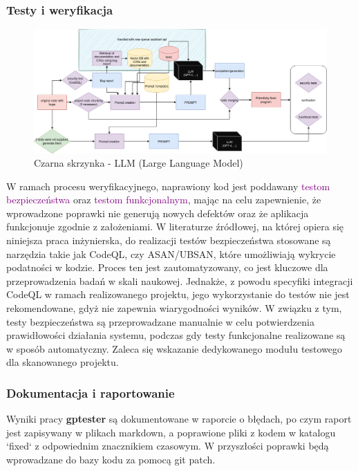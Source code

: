 \subsubsection{Testy i weryfikacja}
\begin{figure}[h]
    \centering
    \includegraphics[clip, trim=25cm 2cm 0cm 4cm, width=0.9\linewidth]{img/gptester.drawio.png}
    \caption{Czarna skrzynka - LLM (Large Language Model)}
    \label{fig:przyciety_obraz2}
\end{figure}
W ramach procesu weryfikacyjnego, naprawiony kod jest poddawany \textcolor{purple}{testom bezpieczeństwa} oraz \textcolor{purple}{testom funkcjonalnym}, mając na celu zapewnienie, że wprowadzone poprawki nie generują nowych defektów oraz że aplikacja funkcjonuje zgodnie z założeniami. W literaturze źródłowej, na której opiera się niniejsza praca inżynierska, do realizacji testów bezpieczeństwa stosowane są narzędzia takie jak CodeQL, czy ASAN/UBSAN, które umożliwiają wykrycie podatności w kodzie. Proces ten jest zautomatyzowany, co jest kluczowe dla przeprowadzenia badań w skali naukowej. Jednakże, z powodu specyfiki integracji CodeQL w ramach realizowanego projektu, jego wykorzystanie do testów nie jest rekomendowane, gdyż nie zapewnia wiarygodności wyników. W związku z tym, testy bezpieczeństwa są przeprowadzane manualnie w celu potwierdzenia prawidłowości działania systemu, podczas gdy testy funkcjonalne realizowane są w sposób automatyczny. 
Zaleca się wskazanie dedykowanego modułu testowego dla skanowanego projektu.
\subsubsection{Dokumentacja i raportowanie}
Wyniki pracy \textbf{gptester} są dokumentowane w raporcie o błędach, po czym raport jest zapisywany w plikach markdown, a poprawione pliki z kodem w katalogu `fixed` z odpowiednim znacznikiem czasowym. W przyszłości poprawki będą wprowadzane do bazy kodu za pomocą git patch.

